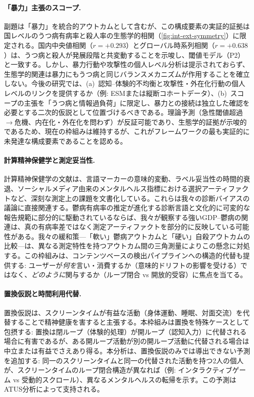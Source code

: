 \documentclass[a4paper,11pt,titlepage]{article}
\begin{document}
\paragraph{「暴力」主張のスコープ.}
副題は「暴力」を統合的アウトカムとして含むが、この構成要素の実証的証拠は国レベルのうつ病有病率と殺人率の生態学的相関（\cref{fig:int-ext-symmetry}）に限定される。国内中央値相関（$r = +0.293$）とグローバル時系列相関（$r = +0.638$）は、うつ病と殺人が発展段階と共変動することを示唆し、閾値モデル（P2）と一致する。しかし、暴力行動や攻撃性の個人レベル分析は提示されておらず、生態学的関連は暴力にもうつ病と同じバランスメカニズムが作用することを確立しない。今後の研究では、(a)~認知--体験的不均衡と攻撃性・外在化行動の個人レベルのリンクを提供するか（例: ESMまたは縦断コホートデータ）、(b)~スコープの主張を「うつ病と情報過負荷」に限定し、暴力との接続は独立した確認を必要とする二次的仮説として位置づけるべきである。理論予測（急性閾値超過$\to$危機、内在化・外在化を問わず）が反証可能であり、生態学的証拠が示唆的であるため、現在の枠組みは維持するが、これがフレームワークの最も実証的に未発達な構成要素であることを認める。

\paragraph{計算精神保健学と測定妥当性.}
計算精神保健学の文献は、言語マーカーの意味的変動、ラベル妥当性の時間的衰退、ソーシャルメディア由来のメンタルヘルス指標における選択アーティファクトなど、深刻な測定上の課題を文書化している。これらは我々の診断バイアスの議論に直接関連する。鬱病有病率の推定が進化する診断言語と文化的に可変的な報告規範に部分的に駆動されているならば、我々が観察する強いGDP--鬱病の関連は、真の有病率差ではなく測定アーティファクトを部分的に反映している可能性がある。我々の緩和策---「軟い」鬱病アウトカムと「硬い」自殺アウトカムの比較---は、異なる測定特性を持つアウトカム間の三角測量によりこの懸念に対処する。この枠組みは、コンテンツベースの検出パイプラインへの構造的代替も提供する: ユーザーが\textit{何を}言い・消費するか（意味的ドリフトの影響を受ける）ではなく、\textit{どのように}関与するか（ループ閉合 vs 開放的受容）に焦点を当てる。

\paragraph{置換仮説と時間利用代替.}
置換仮説は、スクリーンタイムが有益な活動（身体運動、睡眠、対面交流）を代替することで精神健康を害すると主張する。本枠組みは置換を特殊ケースとして包摂する: 置換は閉ループ（体験的処理）が開ループ（認知入力）に代替される場合に有害であるが、ある開ループ活動が別の開ループ活動に代替される場合は中立または有益でさえあり得る。本分析は、置換仮説のみでは導出できない予測を追加する: 同一のスクリーンタイムと同一の代替された活動を持つ2人の個人が、スクリーンタイムのループ閉合構造が異なれば（例: インタラクティブゲーム vs 受動的スクロール）、異なるメンタルヘルスの転帰を示す。この予測はATUS分析によって支持される。
\end{document}
